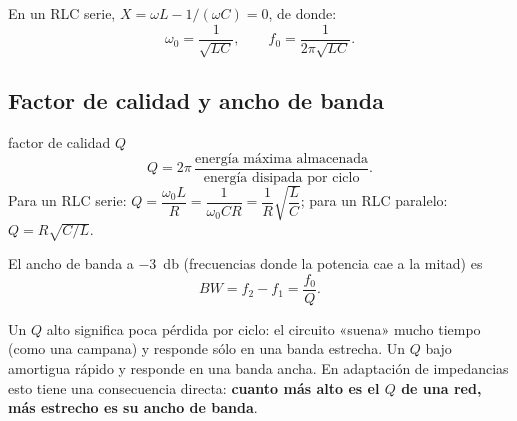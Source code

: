En un RLC serie, $X = \omega L - 1/(\omega C) = 0$, de donde:
\begin{equation}
  \omega_0 = \frac{1}{\sqrt{LC}}, \qquad f_0 = \frac{1}{2\pi\sqrt{LC}}.
\end{equation}
\begin{donde}
\end{donde}

\subsection{Factor de calidad y ancho de banda}
\begin{definicion}{factor de calidad $Q$}
\begin{equation}
  Q = 2\pi\,\frac{\text{energía máxima almacenada}}{\text{energía disipada por ciclo}} .
\end{equation}
Para un RLC serie: $Q = \dfrac{\omega_0 L}{R} = \dfrac{1}{\omega_0 C R} = \dfrac{1}{R}\sqrt{\dfrac{L}{C}}$; para un RLC paralelo:
$Q = R\sqrt{C/L}$.
\end{definicion}
El ancho de banda a \SI{-3}{\decibel} (frecuencias donde la potencia cae a la mitad) es
\begin{equation}
  BW = f_2 - f_1 = \frac{f_0}{Q}.
\end{equation}
\begin{donde}
\end{donde}

\begin{intuicion}
Un $Q$ alto significa poca pérdida por ciclo: el circuito «suena» mucho tiempo (como una campana) y responde sólo en una banda
estrecha. Un $Q$ bajo amortigua rápido y responde en una banda ancha. En adaptación de impedancias esto tiene una consecuencia
directa: \textbf{cuanto más alto es el $Q$ de una red, más estrecho es su ancho de banda}.
\end{intuicion}

